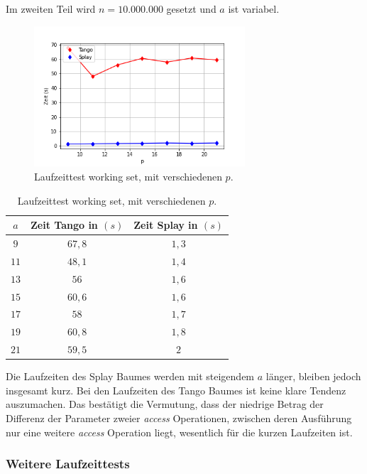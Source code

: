 \documentclass[a4paper,12pt]{article}
\begin{document}
\noindent Im zweiten Teil wird $n = 10.000.000$ gesetzt und $a$ ist variabel. 
\begin{figure}[H]
	\centering
	\includegraphics[width=0.7\textwidth]{"Medien/laufzeittest/diagramm/workingset2"}
	\caption{Laufzeittest working set, mit verschiedenen $p$.}
\end{figure}
\begin{table}[H]
	\begin{center}
		\begin{tabular}[c]{|c|c|c|}
			\hline
			$a$ & Zeit Tango in $\left(s\right)$ &Zeit Splay in $\left(s\right)$ \\
			\hline
			$9$  & $67,8$ &$1,3$  \\
			\hline
			$11$  & $48,1$ &$1,4$  \\
			\hline
		    $13$  & $56$ &$1,6$  \\
			\hline
			$15$  & $60,6$ &$1,6$  \\
			\hline
			$17$  & $58$ &$1,7$  \\
			\hline
			$19$  & $60,8$ &$1,8$  \\
			\hline
			$21$  & $59,5$ &$2$  \\
			\hline
		\end{tabular}
		\caption{Laufzeittest working set, mit verschiedenen $p$.} 
	\end{center}
\end{table}


\noindent Die Laufzeiten des Splay Baumes werden mit steigendem $a$ länger, bleiben jedoch insgesamt kurz. Bei den Laufzeiten des Tango Baumes ist keine klare Tendenz auszumachen. Das bestätigt die Vermutung, dass der niedrige Betrag der Differenz der Parameter zweier \textit{access} Operationen, zwischen deren Ausführung nur eine weitere \textit{access} Operation liegt, wesentlich für die kurzen Laufzeiten ist.     
\newpage
\subsubsection{Weitere Laufzeittests}
\end{document}
